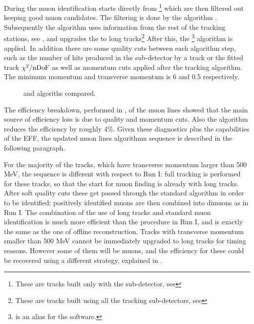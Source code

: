During \runone the muon identification starts directly from \veloTracks\footnote{These are tracks built only with the \velo sub-detector, see }
which are then filtered out keeping good muon candidates. The filtering is done by the \mvm algorithm \cite{LHCb-PUB-2011-017}.
Subsequently the \FwD algorithm uses information from the rest of the tracking stations, see , and
upgrades the \veloTracks to long tracks\footnote{These are tracks built using all the tracking sub-detectors, see }
After this, the \isMuon\footnote{\isMuon is an alias for the \muonID software.} algorithm is applied.
In addition there are some quality cuts between each algorithm step, such as the number of hits produced in the
\velo sub-detector by a track or the fitted track $\chi^2/{\rm nDoF}$ as well as momentum cuts applied after the \FwD
tracking algorithm. The minimum momentum and transverse momentum is 6 \gevc and 0.5 \gevc respectively.

\begin{figure}[t]
  \centering
  \scalebox{1}{}
  \scalebox{1}{}
 \caption{ \runone and \runtwo \hltone algoriths compared. }
  \label{hlt1_algo_seq}
\end{figure}

The efficiency breakdown, performed in \cite{kevinThesis}, of the \runone \hltone muon lines showed that the
main source of efficiency loss is due to quality and momentum cuts. Also the \mvm algorithm reduces the
efficiency by roughly $4\%$. Given these diagnostics plus the \runtwo capabilities of the EFF, the updated
\hltone muon lines algorithmn sequence is described in the following paragraph.

For the majority of the tracks, which have transverse momentum larger than 500 MeV, the sequence is different with respect to
Run I: full tracking is performed for these tracks, so that the start for muon finding is already with long tracks.
After soft quality cuts these get passed through the standard \isMuon algorithm in order to be identified;
positively identified muons are then combined into dimuons as in Run I.
The combination of the use of long tracks and standard muon identification is much more efficient than the
procedure in Run I, and is exactly the same as the one of offline reconstruction.
Tracks with transverse momentum smaller than 500 MeV cannot be immediately upgraded to long tracks for timing reasons.
However some of them will be muons, and the efficiency for these could be recovered using a different strategy,
explained in .
